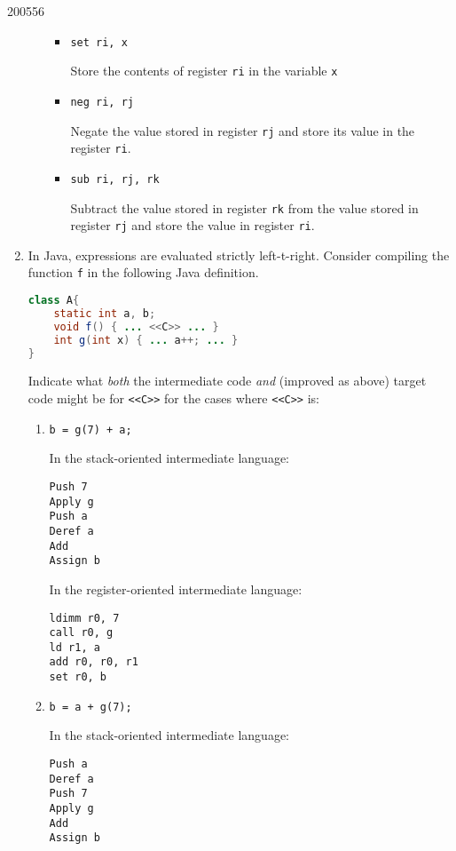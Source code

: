 \documentclass[10pt,\jkfside,a4paper]{article}
\begin{document}
\begin{examquestion}{2005}{5}{6}
\begin{enumerate}
\begin{enumerate}
\begin{itemize}
\item \texttt{set ri, x}

Store the contents of register \texttt{ri} in the variable \texttt{x}

\item \texttt{neg ri, rj}

Negate the value stored in register \texttt{rj} and store its value in the
register \texttt{ri}.

\item \texttt{sub ri, rj, rk}

Subtract the value stored in register \texttt{rk} from the value stored in
register \texttt{rj} and store the value in register \texttt{ri}.

\end{itemize}

\end{enumerate}

\item In Java, expressions are evaluated strictly left-t-right. Consider
compiling the function \texttt{f} in the following Java definition.
\begin{lstlisting}[language=Java]
class A{
	static int a, b;
	void f() { ... <<C>> ... }
	int g(int x) { ... a++; ... }
}
\end{lstlisting}

Indicate what \textit{both} the intermediate code \textit{and} (improved as
above) target code might be for \texttt{<<C>>} for the cases where
\texttt{<<C>>} is:

\begin{enumerate}

\item \texttt{b = g(7) + a;}

In the stack-oriented intermediate language:
\begin{lstlisting}
Push 7
Apply g
Push a
Deref a
Add
Assign b
\end{lstlisting}

In the register-oriented intermediate language:
\begin{lstlisting}
ldimm r0, 7
call r0, g
ld r1, a
add r0, r0, r1
set r0, b
\end{lstlisting}

\item \texttt{b = a + g(7);}

In the stack-oriented intermediate language:
\begin{lstlisting}
Push a
Deref a
Push 7
Apply g
Add
Assign b
\end{lstlisting}


\end{enumerate}
\end{enumerate}
\end{examquestion}
\end{document}
